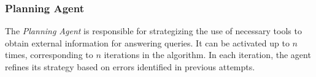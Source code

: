 \documentclass[runningheads]{llncs}
\begin{document}

\subsubsection{Planning Agent}
The \textit{Planning Agent} is responsible for strategizing the use of necessary tools to obtain external information for answering queries. It can be activated up to $n$ times, corresponding to $n$ iterations in the algorithm. In each iteration, the agent refines its strategy based on errors identified in previous attempts.

\end{document}
